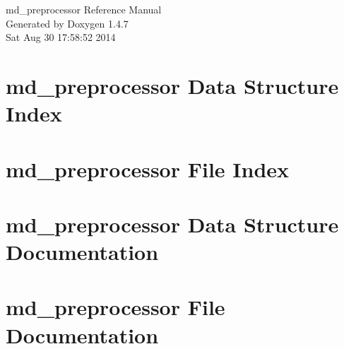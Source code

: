 \documentclass[letterpaper]{book}
\begin{document}
\begin{titlepage}
\vspace*{7cm}
\begin{center}
{\Large md\_\-preprocessor Reference Manual}\\
\vspace*{1cm}
{\large Generated by Doxygen 1.4.7}\\
\vspace*{0.5cm}
{\small Sat Aug 30 17:58:52 2014}\\
\end{center}
\end{titlepage}
\clearemptydoublepage
{}
\tableofcontents
\clearemptydoublepage
{}
\chapter{md\_\-preprocessor Data Structure Index}

\chapter{md\_\-preprocessor File Index}

\chapter{md\_\-preprocessor Data Structure Documentation}






\chapter{md\_\-preprocessor File Documentation}




\printindex
\end{document}
